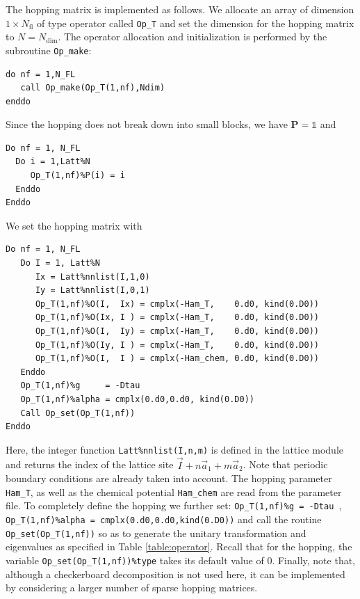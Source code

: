 The hopping matrix is implemented as follows.
We allocate an array of dimension $1\times N_{\mathrm{fl}}$ of type operator  called \texttt{Op\_T} and set the  dimension for the hopping  matrix to $N=N_{\mathrm{dim}}$. The operator allocation and initialization is performed by the subroutine \texttt{Op\_make}:
\begin{lstlisting}[style=fortran]
do nf = 1,N_FL
   call Op_make(Op_T(1,nf),Ndim)
enddo
\end{lstlisting}
Since the hopping  does not  break down into small blocks, we have ${\bm P}=\mathds{1}$   and  
\begin{lstlisting}[style=fortran]
Do nf = 1, N_FL
  Do i = 1,Latt%N
     Op_T(1,nf)%P(i) = i
  Enddo
Enddo
\end{lstlisting}
We set the hopping matrix  with 
\begin{lstlisting}[style=fortran]
Do nf = 1, N_FL
   Do I = 1, Latt%N
      Ix = Latt%nnlist(I,1,0)
      Iy = Latt%nnlist(I,0,1)
      Op_T(1,nf)%O(I,  Ix) = cmplx(-Ham_T,    0.d0, kind(0.D0))
      Op_T(1,nf)%O(Ix, I ) = cmplx(-Ham_T,    0.d0, kind(0.D0))
      Op_T(1,nf)%O(I,  Iy) = cmplx(-Ham_T,    0.d0, kind(0.D0))
      Op_T(1,nf)%O(Iy, I ) = cmplx(-Ham_T,    0.d0, kind(0.D0))
      Op_T(1,nf)%O(I,  I ) = cmplx(-Ham_chem, 0.d0, kind(0.D0))
   Enddo
   Op_T(1,nf)%g     = -Dtau
   Op_T(1,nf)%alpha = cmplx(0.d0,0.d0, kind(0.D0))
   Call Op_set(Op_T(1,nf))
Enddo
\end{lstlisting}
Here, the integer function \texttt{Latt\%nnlist(I,n,m)} is defined in the lattice module and returns the index of the lattice site $ \vec{I} +  n \vec{a}_1 +  m \vec{a}_2$.
Note that periodic boundary conditions are 
already taken into account.  The hopping parameter \texttt{Ham\_T}, as well as the chemical potential \texttt{Ham\_chem} are read from the parameter file.  
To completely define the hopping  we further set: \texttt{Op\_T(1,nf)\%g = -Dtau }, \texttt{Op\_T(1,nf)\%alpha = cmplx(0.d0,0.d0,kind(0.D0))} and call the routine  \texttt{Op\_set(Op\_T(1,nf))}  so as to generate  the unitary transformation and eigenvalues as specified in Table \ref{table:operator}.  Recall that for the hopping, the variable  \texttt{Op\_set(Op\_T(1,nf))\%type}  takes its default value of 0.  
Finally, note that, although a checkerboard decomposition is not used here, it can be implemented by considering a larger number of sparse hopping matrices.  


